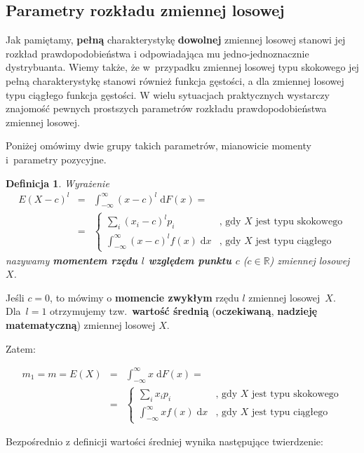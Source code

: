 \documentclass[10pt,a4paper]{article}
\newtheorem{definition}{Definicja}[section]
\newcommand{\dd}{\; \mathrm{d}}
\numberwithin{equation}{subsection}
\begin{document}
\subsection{Parametry rozkładu zmiennej losowej}
Jak pamiętamy, \textbf{pełną} charakterystykę \textbf{dowolnej} zmiennej losowej
stanowi jej rozkład prawdopodobieństwa i odpowiadająca mu jedno-jednoznacznie
dystrybuanta. Wiemy także, że w~przypadku zmiennej losowej typu skokowego jej
pełną charakterystykę stanowi również funkcja gęstości, a dla zmiennej losowej
typu ciągłego funkcja gęstości.  W wielu sytuacjach praktycznych wystarczy
znajomość pewnych prostszych parametrów rozkładu prawdopodobieństwa zmiennej
losowej.

Poniżej omówimy dwie grupy takich parametrów, mianowicie momenty i~parametry
pozycyjne.

\begin{definition}
  Wyrażenie
  \begin{eqnarray}
    E(X-c)^l &= & \int_{-\infty}^{\infty}(x-c)^l\dd{F(x)} = \\
    \nonumber
    &= & \begin{cases}
      \sum_i(x_i-c)^lp_i & \textrm{, gdy $X$ jest typu skokowego} \\
      \int_{-\infty}^{\infty}(x-c)^lf(x)\dd{x} & \textrm{, gdy $X$ jest typu ciągłego}
    \end{cases}
  \end{eqnarray}
  nazywamy \textbf{momentem rzędu $l$ względem punktu $c$} ($c \in \mathbb{R}$)
  zmiennej losowej $X$.
\end{definition}

Jeśli $c=0$, to mówimy o \textbf{momencie zwykłym} rzędu $l$ zmiennej
losowej~$X$. Dla~$l=1$ otrzymujemy tzw.~\textbf{wartość średnią}
(\textbf{oczekiwaną}, \textbf{nadzieję matematyczną}) zmiennej losowej $X$.

Zatem:

\begin{eqnarray}
  m_1 = m = E(X) & = & \int_{-\infty}^{\infty}x\dd{F(x)} = \\
  \nonumber
  & = & \begin{cases}
    \sum_ix_ip_i & \textrm{, gdy $X$ jest typu skokowego}\\
    \int_{-\infty}^{\infty}xf(x)\dd{x} & \textrm{, gdy $X$ jest typu ciągłego}
  \end{cases}
\end{eqnarray}

Bezpośrednio z definicji wartości średniej wynika następujące twierdzenie:
\end{document}
